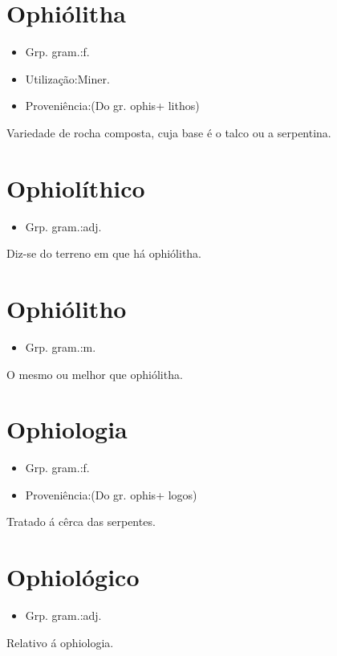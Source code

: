 \section{Ophiólitha}
\begin{itemize}
\item {Grp. gram.:f.}
\end{itemize}
\begin{itemize}
\item {Utilização:Miner.}
\end{itemize}
\begin{itemize}
\item {Proveniência:(Do gr. \textunderscore ophis\textunderscore  + \textunderscore lithos\textunderscore )}
\end{itemize}
Variedade de rocha composta, cuja base é o talco ou a serpentina.
\section{Ophiolíthico}
\begin{itemize}
\item {Grp. gram.:adj.}
\end{itemize}
Diz-se do terreno em que há ophiólitha.
\section{Ophiólitho}
\begin{itemize}
\item {Grp. gram.:m.}
\end{itemize}
O mesmo ou melhor que \textunderscore ophiólitha\textunderscore .
\section{Ophiologia}
\begin{itemize}
\item {Grp. gram.:f.}
\end{itemize}
\begin{itemize}
\item {Proveniência:(Do gr. \textunderscore ophis\textunderscore  + \textunderscore logos\textunderscore )}
\end{itemize}
Tratado á cêrca das serpentes.
\section{Ophiológico}
\begin{itemize}
\item {Grp. gram.:adj.}
\end{itemize}
Relativo á ophiologia.
